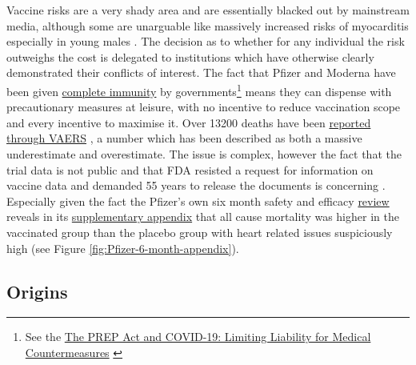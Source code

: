 \documentclass[11pt,a4paper,notitlepage]{report}
\begin{document}
Vaccine risks are a very shady area and are essentially blacked out by mainstream media, although some are unarguable like massively increased risks of myocarditis especially in young males \cite{10.1001/jama.2021.24110}. The decision as to whether for any individual the risk outweighs the cost is delegated to institutions which have otherwise clearly demonstrated their conflicts of interest. The fact that Pfizer and Moderna have been given \href{https://www.cnbc.com/2020/12/16/covid-vaccine-side-effects-compensation-lawsuit.html}{complete immunity} \cite{cnbc17122020} by governments\footnote{See the \href{https://crsreports.congress.gov/product/pdf/LSB/LSB10443}{The PREP Act and COVID-19: Limiting Liability for Medical Countermeasures} \cite{cnsreports13012022}} means they can dispense with precautionary measures at leisure, with no incentive to reduce vaccination scope and every incentive to maximise it. Over 13200 deaths have been \href{https://www.cdc.gov/coronavirus/2019-ncov/vaccines/safety/adverse-events.html}{reported through VAERS} \cite{cdc14032022}, a number which has been described as both a massive underestimate and overestimate. The issue is complex, however the fact that the trial data is not public and that FDA resisted a request for information on vaccine data and demanded 55 years to release the documents is concerning \cite{mailonline19112021}. Especially given the fact the Pfizer's own six month safety and efficacy \href{https://www.nejm.org/doi/full/10.1056/NEJMoa2110345}{review} \cite{doi:10.1056/NEJMoa2110345} reveals in its \href{https://www.nejm.org/doi/suppl/10.1056/NEJMoa2110345/suppl_file/nejmoa2110345_appendix.pdf}{supplementary appendix} \cite{doi:10.1056/NEJMoa2110345-appendix} that all cause mortality was higher in the vaccinated group than the placebo group with heart related issues suspiciously high (see Figure \ref{fig:Pfizer-6-month-appendix}).



\subsection*{Origins}
\end{document}
